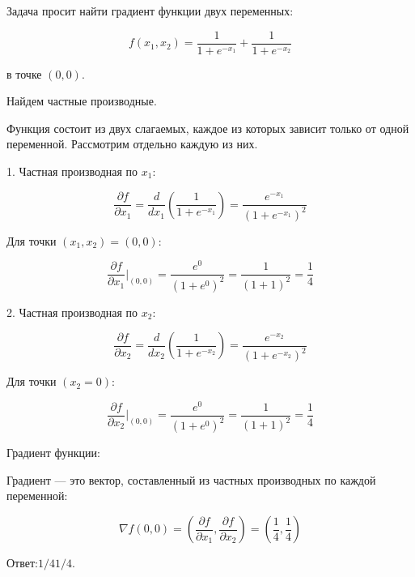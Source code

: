 \documentclass{article}
\begin{document}
Задача просит найти градиент функции двух переменных:

\[
f(x_1, x_2) = \frac{1}{1 + e^{-x_1}} + \frac{1}{1 + e^{-x_2}}
\]

в точке \( (0, 0) \).

 Найдем частные производные.

Функция состоит из двух слагаемых, каждое из которых зависит только от одной переменной. Рассмотрим отдельно каждую из них.

1. Частная производная по \( x_1 \):

\[
\frac{\partial f}{\partial x_1} = \frac{d}{d x_1} \left( \frac{1}{1 + e^{-x_1}} \right) = \frac{e^{-x_1}}{(1 + e^{-x_1})^2}
\]

Для точки \( (x_1, x_2) = (0, 0) \):

\[
\frac{\partial f}{\partial x_1} \bigg|_{(0, 0)} = \frac{e^0}{(1 + e^0)^2} = \frac{1}{(1+1)^2} = \frac{1}{4}
\]

2. Частная производная по \( x_2 \):

\[
\frac{\partial f}{\partial x_2} = \frac{d}{d x_2} \left( \frac{1}{1 + e^{-x_2}} \right) = \frac{e^{-x_2}}{(1 + e^{-x_2})^2}
\]

Для точки \( (x_2 = 0) \):

\[
\frac{\partial f}{\partial x_2} \bigg|_{(0, 0)} = \frac{e^0}{(1 + e^0)^2} = \frac{1}{(1+1)^2} = \frac{1}{4}
\]

 Градиент функции:

Градиент — это вектор, составленный из частных производных по каждой переменной:

\[
\nabla f(0, 0) = \left( \frac{\partial f}{\partial x_1}, \frac{\partial f}{\partial x_2} \right) = \left( \frac{1}{4}, \frac{1}{4} \right)
\]

Ответ:$1/4 1/4$.
\end{document}
